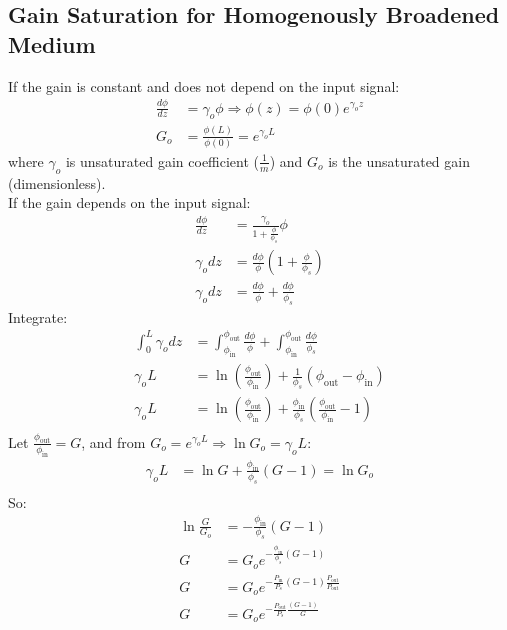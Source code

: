 \documentclass[11pt]{article}
\begin{document}
\subsection{Gain Saturation for Homogenously Broadened Medium}
If the gain is constant and does not depend on the input signal:
\begin{align*}
    \frac{d \phi}{dz} &= \gamma_o \phi \Rightarrow \phi(z) = \phi(0) e^{\gamma_o z} \\
    G_o &= \frac{\phi(L)}{\phi(0)} = e^{\gamma_o L}
\end{align*}
where $\gamma_o$ is unsaturated gain coefficient ($\frac{1}{m}$) and $G_o$ is the unsaturated gain (dimensionless). \\
If the gain depends on the input signal:
\begin{align*}
    \frac{d \phi}{dz} &= \frac{\gamma_o}{1 + \frac{\phi}{\phi_s}} \phi \\
    \gamma_o dz &= \frac{d \phi}{\phi} \left(1 + \frac{\phi}{\phi_s}\right)\\
    \gamma_o dz &= \frac{d \phi}{\phi} + \frac{d \phi}{\phi_s}
\end{align*}
Integrate:
\begin{align*}
    \int_{0}^{L} \gamma_o dz &= \int_{\phi_{\text{in}}}^{\phi_{\text{out}}} \frac{d \phi}{\phi} + \int_{\phi_{\text{in}}}^{\phi_{\text{out}}} \frac{d \phi}{\phi_s} \\
    \gamma_o L &= \ln \left( \frac{\phi_{\text{out}}}{\phi_{\text{in}}} \right) + \frac{1}{\phi_s} (\phi_{\text{out}} - \phi_{\text{in}}) \\
    \gamma_o L &= \ln \left( \frac{\phi_{\text{out}}}{\phi_{\text{in}}} \right) + \frac{\phi_{\text{in}}}{\phi_s} \left( \frac{\phi_{\text{out}}}{\phi_{\text{in}}} - 1\right) \\
\end{align*}
Let $\frac{\phi_{\text{out}}}{\phi_{\text{in}}} = G$, and from $ G_o = e^{\gamma_o L} \Rightarrow \ln G_o = \gamma_o L $:
\begin{align*}
    \gamma_o L&= \ln G + \frac{\phi_{\text{in}}}{\phi_s} (G-1) = \ln G_o\\
\end{align*}
So:
\begin{align*}
    \ln \frac{G}{G_o} &= -\frac{\phi_{\text{in}}}{\phi_s} (G-1) \\
    G &= G_o e^{-\frac{\phi_{\text{in}}}{\phi_s} (G-1)} \\
    G &= G_o e^{-\frac{P_{\text{in}}}{P_s} (G-1) \frac{P_{\text{out}}}{P_{\text{out}}}} \\
    G &= G_o e^{-\frac{P_{\text{out}}}{P_s} \frac{(G-1)}{G}}
\end{align*}
\end{document}
